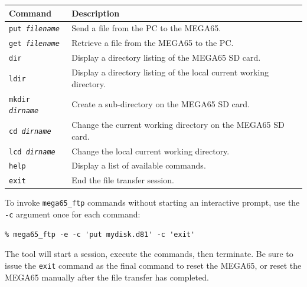 \begin{center}
\begin{tabular}{|l|l|}
\hline
{\bf Command} & {\bf Description} \\
\hline
{\tt put {\it filename}} & Send a file from the PC to the MEGA65. \\
\hline
{\tt get {\it filename}} & Retrieve a file from the MEGA65 to the PC. \\
\hline
{\tt dir} & Display a directory listing of the MEGA65 SD card. \\
\hline
{\tt ldir} & Display a directory listing of the local current working directory. \\
\hline
{\tt mkdir {\it dirname}} & Create a sub-directory on the MEGA65 SD card. \\
\hline
{\tt cd {\it dirname}} & Change the current working directory on the MEGA65 SD card. \\
\hline
{\tt lcd {\it dirname}} & Change the local current working directory. \\
\hline
{\tt help} & Display a list of available commands. \\
\hline
{\tt exit} & End the file transfer session. \\
\hline
\end{tabular}
\end{center}

To invoke {\tt mega65\_ftp} commands without starting an interactive prompt, use the {\tt -c} argument once for each command:

\begin{verbatim}
% mega65_ftp -e -c 'put mydisk.d81' -c 'exit'
\end{verbatim}

The tool will start a session, execute the commands, then terminate. Be sure to issue the {\tt exit} command as the final command to reset the MEGA65, or reset the MEGA65 manually after the file transfer has completed.